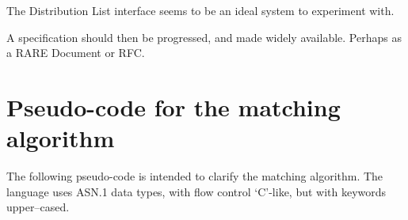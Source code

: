 The Distribution List interface seems to be an ideal system to experiment
with.

A specification should then be progressed, and made widely available.
Perhaps as a RARE Document or RFC.




\pagebreak
\appendix

\section{Pseudo-code for the matching algorithm}

The following pseudo-code is intended to clarify the matching algorithm.
The language uses ASN.1 data types, with flow control `C'-like, but with
keywords upper--cased.






